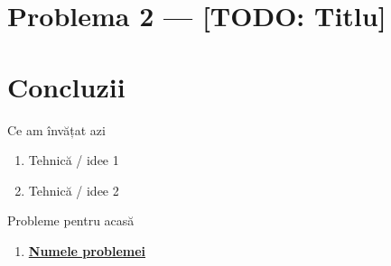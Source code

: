 \documentclass{beamer}
\begin{document}
\section{Problema 2 --- [TODO: Titlu]}


\section{Concluzii}

\begin{frame}{Ce am învățat azi}
  \begin{enumerate}
    \item Tehnică / idee 1
    \item Tehnică / idee 2
  \end{enumerate}
\end{frame}

\begin{frame}[t]{Probleme pentru acasă}
  \begin{enumerate}
    \item \href{URL}{\textbf{Numele problemei}}
  \end{enumerate}
\end{frame}
\end{document}
